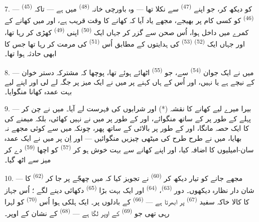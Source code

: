 7. ---  \textsuperscript{(45)} کو دیکھ کر، جو اپنے
 \textsuperscript{(47)} سے نکلا تھا — وہ باورچی
خانہ  \textsuperscript{(48)} میں ہے — تاکہ
 \textsuperscript{(46)} کو کسی کام پر بھیجے،
مجھے یاد آیا کہ کھانے کا وقت قریب ہے، اور میں کھانے کے کمرے میں داخل
ہوا، اُس صحن سے گزر کر جہاں ایک 
\textsuperscript{(50)} اپنی  \textsuperscript{(49)}
کھڑی کر رہا تھا، اور جہاں ایک  \textsuperscript{(52)}
 \textsuperscript{(53)} کی ہدایتوں کے مطابق اُس
 \textsuperscript{(51)} کی مرمت کر
رہا تھا جس کا ابھی حادثہ ہوا تھا۔

8. --- میں نے ایک جوان  \textsuperscript{(54)} سے، جو
 \textsuperscript{(55)} اٹھائے ہوئے تھا، پوچھا کہ
مشترکہ دستر خوان  کے نیچے ہے یا نہیں، اور اُس کے ہاں
کہنے پر میں نے ایک میز پر جگہ لے لی اور اپنے لیے بہت عمدہ کھانا
منگوایا۔


\VUsaut{4.0mm}
\VUsaut{3.0mm}

9. --- بیرا میرے لیے کھانے کا نقشہ (*) اور شرابوں کی فہرست لے آیا۔
میں نے چن کر پہلے  کے طور پر  کے ساتھ
 منگوائے، اور  کے طور پر
 میں نے  نہیں کھائی،
بلکہ میمنے کی  کا ایک حصہ مانگا، اور  کے
طور پر بالائی کے ساتھ  پھر، چونکہ  میں سے کوئی مجھے نہ بھایا، میں نے طرح طرح کی میٹھی چیزیں
منگوائیں —   اور  اِن پر میں
نے ایک عمدہ سان-امیلیوں  کا اضافہ کیا، اور اپنے کھانے
سے بہت خوش ہو کر  \textsuperscript{(57)} کو اچھا
 \textsuperscript{(59)} دے کر میز سے اٹھ گیا۔

10. --- مجھے جانے کو تیار دیکھ کر  \textsuperscript{(60)}
نے تجویز کیا کہ میں چھجّے پر جا کر 
\textsuperscript{(62)} کا شان دار نظارہ دیکھوں۔ دور
 \textsuperscript{(63)}،
 \textsuperscript{(64)} اور ایک بہت بڑا
 \textsuperscript{(65)} دکھائی دینے لگے ؛ اُس جہاز کا
کالا خاکہ سفید  \textsuperscript{(67)} پر ابھرتا ہے —
 \textsuperscript{(66)} کے بادلوں پر۔ ایک ہلکی ہوا اُس
 \textsuperscript{(70)} کو لہرا رہی تھی جو
 \textsuperscript{(69)} کے اوپر لگا ہے — 
\textsuperscript{(68)} کے نشان کے اوپر۔

